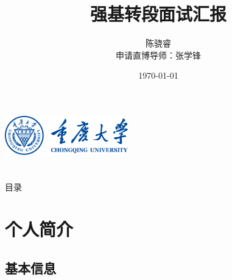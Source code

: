 \documentclass[12pt,aspectratio=169,UTF8]{beamer}
\title{强基转段面试汇报}
\author[陈骁睿]{\texorpdfstring{陈骁睿\\申请直博导师：张学锋}{陈骁睿}}
\date{\today}
\institute{重庆大学物理学院}
\begin{document}
\begin{frame}[plain]
  \begin{center}
      \includegraphics[width=0.4\textwidth]{校徽+中英文校名_蓝色.pdf}
  \end{center}
  \titlepage
\end{frame}
\setcounter{framenumber}{0}

\section*{}
\begin{frame}{目录}
  \begin{multicols}{2}
    \tableofcontents[subsubsectionstyle=hide]
  \end{multicols}
\end{frame}

\section{个人简介}
\subsection{基本信息}
\end{document}
